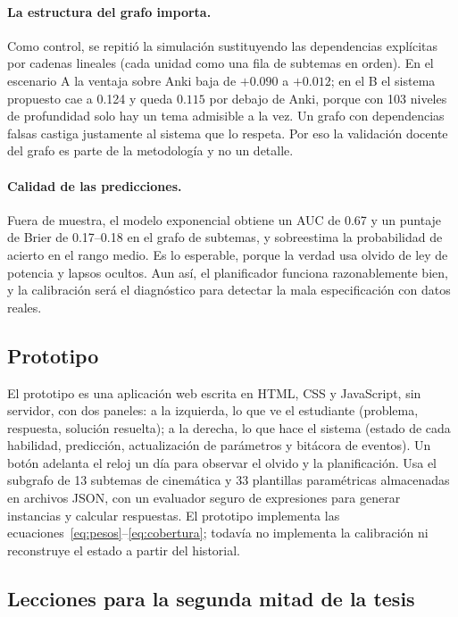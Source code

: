 \documentclass[12pt]{article}
\theoremstyle{definition}
\begin{document}
\paragraph{La estructura del grafo importa.} Como control, se repitió la simulación sustituyendo las dependencias explícitas por cadenas lineales (cada unidad como una fila de subtemas en orden). En el escenario A la ventaja sobre Anki baja de $+0.090$ a $+0.012$; en el B el sistema propuesto cae a 0.124 y queda $0.115$ por debajo de Anki, porque con 103 niveles de profundidad solo hay un tema admisible a la vez. Un grafo con dependencias falsas castiga justamente al sistema que lo respeta. Por eso la validación docente del grafo es parte de la metodología y no un detalle.

\paragraph{Calidad de las predicciones.} Fuera de muestra, el modelo exponencial obtiene un AUC de 0.67 y un puntaje de Brier de 0.17--0.18 en el grafo de subtemas, y sobreestima la probabilidad de acierto en el rango medio. Es lo esperable, porque la verdad usa olvido de ley de potencia y lapsos ocultos. Aun así, el planificador funciona razonablemente bien, y la calibración será el diagnóstico para detectar la mala especificación con datos reales.

\subsection{Prototipo}

El prototipo es una aplicación web escrita en HTML, CSS y JavaScript, sin servidor, con dos paneles: a la izquierda, lo que ve el estudiante (problema, respuesta, solución resuelta); a la derecha, lo que hace el sistema (estado de cada habilidad, predicción, actualización de parámetros y bitácora de eventos). Un botón adelanta el reloj un día para observar el olvido y la planificación. Usa el subgrafo de 13 subtemas de cinemática y 33 plantillas paramétricas almacenadas en archivos JSON, con un evaluador seguro de expresiones para generar instancias y calcular respuestas. El prototipo implementa las ecuaciones~\eqref{eq:pesos}--\eqref{eq:cobertura}; todavía no implementa la calibración ni reconstruye el estado a partir del historial.

\subsection{Lecciones para la segunda mitad de la tesis}
\end{document}
